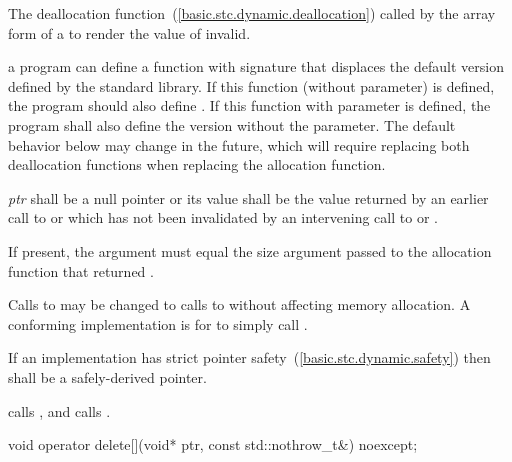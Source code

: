 \begin{itemdescr}
\pnum
\effects
The
deallocation function~(\ref{basic.stc.dynamic.deallocation})
called by the array form of a
to render the value of  invalid.

\pnum
\replaceable
a \Cpp program can define a function with signature
 that displaces the default
version defined by the \Cpp standard library. If this function (without 
parameter) is defined, the program should also define
. If this function
with  parameter is defined, the program shall also define the version
without the  parameter.
\enternote The default behavior below may change in the future, which will require
replacing both deallocation functions when replacing the allocation function. \exitnote

\pnum
\requires
\textit{ptr} shall be a null pointer or its value shall be
the value returned by an earlier call to
or
which has not been invalidated by an intervening call to
 or
.

\pnum
\requires If present, the  argument must equal the size
argument passed to the allocation function that returned .

\pnum
\required Calls to  may be changed
to calls to  without affecting memory allocation.
\enternote A conforming implementation is for
 to simply call
. \exitnote

\pnum
\requires
If an implementation has strict pointer safety~(\ref{basic.stc.dynamic.safety})
then  shall be a safely-derived pointer.

\pnum
{}
{} calls
, and
 calls
.
\end{itemdescr}

%
\begin{itemdecl}
void operator delete[](void* ptr, const std::nothrow_t&) noexcept;
\end{itemdecl}

